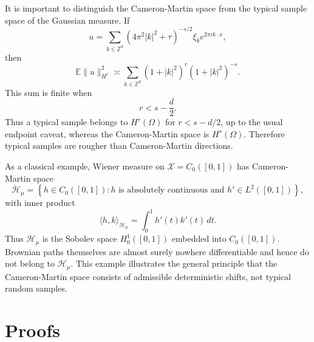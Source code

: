 \documentclass[11pt]{article}
\begin{document}
It is important to distinguish the Cameron-Martin space from the typical sample space of the Gaussian measure. If
\[
    u
    =
    \sum_{k\in\mathbb Z^d}
    (4\pi^2|k|^2+\tau)^{-s/2}\xi_k e^{2\pi i k\cdot x},
\]
then
\[
    \mathbb E\|u\|_{H^r}^2
    \asymp
    \sum_{k\in\mathbb Z^d}
    (1+|k|^2)^r(1+|k|^2)^{-s}.
\]
This sum is finite when
\[
    r<s-\frac d2.
\]
Thus a typical sample belongs to $H^r(\Omega)$ for $r<s-d/2$, up to the usual endpoint caveat, whereas the Cameron-Martin space is $H^s(\Omega)$. Therefore typical samples are rougher than Cameron-Martin directions.

As a classical example, Wiener measure on $\mathcal X=C_0([0,1])$ has Cameron-Martin space
\[
    \mathcal H_\mu
    =
    \left\{
        h\in C_0([0,1]):
        h \text{ is absolutely continuous and } h'\in L^2([0,1])
    \right\},
\]
with inner product
\[
    \langle h,k\rangle_{\mathcal H_\mu}
    =
    \int_0^1 h'(t)k'(t)\,dt.
\]
Thus $\mathcal H_\mu$ is the Sobolev space $H_0^1([0,1])$ embedded into $C_0([0,1])$. Brownian paths themselves are almost surely nowhere differentiable and hence do not belong to $\mathcal H_\mu$. This example illustrates the general principle that the Cameron-Martin space consists of admissible deterministic shifts, not typical random samples.

\section{Proofs}
\end{document}
